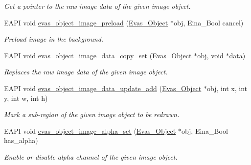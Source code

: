\begin{DoxyCompactItemize}
\begin{DoxyCompactList}\small\item\em Get a pointer to the raw image data of the given image object. \item\end{DoxyCompactList}\item 
EAPI void \hyperlink{group__Evas__Object__Image_gad6383022c4013008d11827b32bf63d59}{evas\_\-object\_\-image\_\-preload} (\hyperlink{group__Evas__Object__Group_ga9e19e6dd1f517a0ba437c0114d3e7c97}{Evas\_\-Object} $\ast$obj, Eina\_\-Bool cancel)
\begin{DoxyCompactList}\small\item\em Preload image in the background. \item\end{DoxyCompactList}\item 
EAPI void \hyperlink{group__Evas__Object__Image_ga97d17b8d95f0ca01a264a6c303d00c27}{evas\_\-object\_\-image\_\-data\_\-copy\_\-set} (\hyperlink{group__Evas__Object__Group_ga9e19e6dd1f517a0ba437c0114d3e7c97}{Evas\_\-Object} $\ast$obj, void $\ast$data)
\begin{DoxyCompactList}\small\item\em Replaces the raw image data of the given image object. \item\end{DoxyCompactList}\item 
EAPI void \hyperlink{group__Evas__Object__Image_gab6b763271781a2ab35f5849f6564e165}{evas\_\-object\_\-image\_\-data\_\-update\_\-add} (\hyperlink{group__Evas__Object__Group_ga9e19e6dd1f517a0ba437c0114d3e7c97}{Evas\_\-Object} $\ast$obj, int x, int y, int w, int h)
\begin{DoxyCompactList}\small\item\em Mark a sub-\/region of the given image object to be redrawn. \item\end{DoxyCompactList}\item 
EAPI void \hyperlink{group__Evas__Object__Image_gadf2df4027a211db3f9a1fb21f248d7fb}{evas\_\-object\_\-image\_\-alpha\_\-set} (\hyperlink{group__Evas__Object__Group_ga9e19e6dd1f517a0ba437c0114d3e7c97}{Evas\_\-Object} $\ast$obj, Eina\_\-Bool has\_\-alpha)
\begin{DoxyCompactList}\small\item\em Enable or disable alpha channel of the given image object. \item\end{DoxyCompactList}\item 

\end{DoxyCompactItemize}
